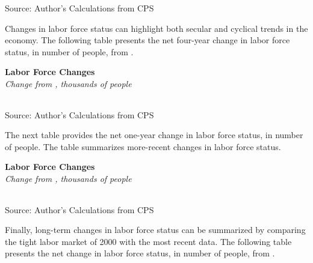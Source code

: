 \documentclass{report}
\begin{document}
{\begin{minipage}{0.76\textwidth}
\footnotesize{Source: Author's Calculations from CPS}
\vspace{4mm}

\small Changes in labor force status can highlight both secular and cyclical trends in the economy. The following table presents the net four-year change in labor force status, in number of people, from \unskip.
\vspace{1mm}

\normalsize \textbf{Labor Force Changes}\\
\footnotesize{\textit{Change from \unskip, thousands of people}}\\
\noindent {} \setlength{\tabcolsep}{3.0pt} \color{black!90}
		{\renewcommand{\arraystretch}{1.5}
		 \begin{tabular}{p{27.8mm} R{11.2mm} R{10.4mm} R{10.4mm} R{10.2mm} 
		 				 R{10.6mm} R{10.4mm} R{10.4mm}}
			  \hline
		\end{tabular}}
		\vspace{-3mm}
		
\footnotesize{Source: Author's Calculations from CPS}
\end{minipage}
\newpage
\begin{minipage}{0.76\textwidth} \small The next table provides the net one-year change in labor force status, in number of people. The table summarizes more-recent changes in labor force status. 
\vspace{1mm}

\normalsize \textbf{Labor Force Changes}\\
\footnotesize{\textit{Change from \unskip, thousands of people}}\\
\noindent {} \setlength{\tabcolsep}{3.0pt} \color{black!90}
		{\renewcommand{\arraystretch}{1.5}
		 \begin{tabular}{p{27.8mm} R{11.2mm} R{10.4mm} R{10.4mm} R{10.2mm} 
		 				 R{10.6mm} R{10.4mm} R{10.4mm}}
			  \hline
		\end{tabular}}
		\vspace{-3mm}
		
\footnotesize{Source: Author's Calculations from CPS}
\vspace{4mm}

\small Finally, long-term changes in labor force status can be summarized by comparing the tight labor market of 2000 with the most recent data. The following table presents the net change in labor force status, in number of people, from \unskip.
\vspace{1mm}


\end{minipage}}
\end{document}
